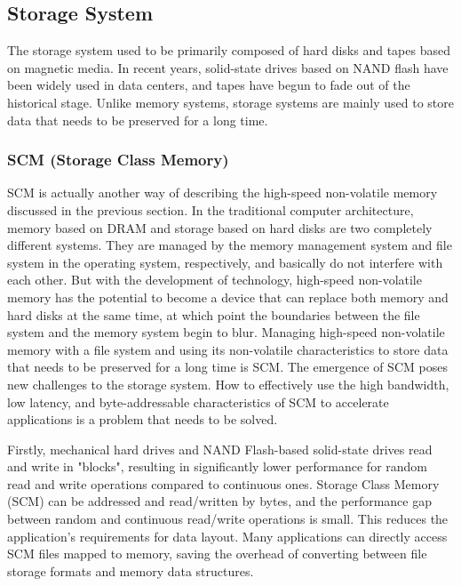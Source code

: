 \subsection{Storage System}

The storage system used to be primarily composed of hard disks and tapes based on magnetic media. In recent years, solid-state drives based on NAND flash have been widely used in data centers, and tapes have begun to fade out of the historical stage. Unlike memory systems, storage systems are mainly used to store data that needs to be preserved for a long time.

\subsubsection{SCM (Storage Class Memory)}

SCM is actually another way of describing the high-speed non-volatile memory discussed in the previous section. In the traditional computer architecture, memory based on DRAM and storage based on hard disks are two completely different systems. They are managed by the memory management system and file system in the operating system, respectively, and basically do not interfere with each other. But with the development of technology, high-speed non-volatile memory has the potential to become a device that can replace both memory and hard disks at the same time, at which point the boundaries between the file system and the memory system begin to blur. Managing high-speed non-volatile memory with a file system and using its non-volatile characteristics to store data that needs to be preserved for a long time is SCM. The emergence of SCM poses new challenges to the storage system. How to effectively use the high bandwidth, low latency, and byte-addressable characteristics of SCM to accelerate applications is a problem that needs to be solved.

Firstly, mechanical hard drives and NAND Flash-based solid-state drives read and write in "blocks", resulting in significantly lower performance for random read and write operations compared to continuous ones. Storage Class Memory (SCM) can be addressed and read/written by bytes, and the performance gap between random and continuous read/write operations is small. This reduces the application's requirements for data layout. Many applications can directly access SCM files mapped to memory, saving the overhead of converting between file storage formats and memory data structures.

